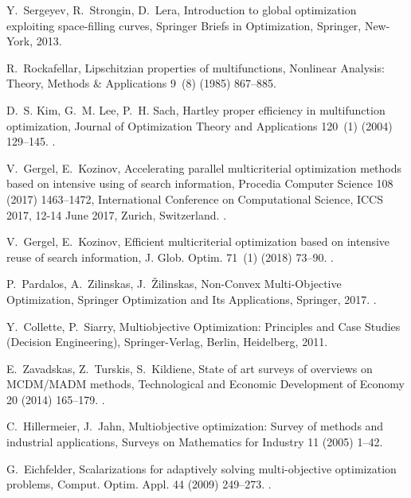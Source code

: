 \documentclass[review]{elsarticle}
\begin{document}
\begin{thebibliography}{10}
Y.~Sergeyev, R.~Strongin, D.~Lera, Introduction to global optimization
  exploiting space-filling curves, Springer Briefs in Optimization, Springer,
  New-York, 2013.

R.~Rockafellar, Lipschitzian properties of multifunctions, Nonlinear Analysis:
  Theory, Methods {\&} Applications 9~(8) (1985) 867--885.

D.~S. Kim, G.~M. Lee, P.~H. Sach, Hartley proper efficiency in multifunction
  optimization, Journal of Optimization Theory and Applications 120~(1) (2004)
  129--145.
\newblock \href {https://doi.org/10.1023/B:JOTA.0000012736.02360.58}
  {}.

V.~Gergel, E.~Kozinov, Accelerating parallel multicriterial optimization
  methods based on intensive using of search information, Procedia Computer
  Science 108 (2017) 1463--1472, {International} Conference on Computational
  Science, {ICCS} 2017, 12-14 June 2017, Zurich, Switzerland.
\newblock \href {https://doi.org/10.1016/j.procs.2017.05.051}
  {}.

V.~Gergel, E.~Kozinov, Efficient multicriterial optimization based on intensive
  reuse of search information, J. Glob. Optim. 71~(1) (2018) 73--90.
\newblock \href {https://doi.org/10.1007/s10898-018-0624-3}
  {}.

P.~Pardalos, A.~Zilinskas, J.~{\v{Z}}ilinskas, Non-Convex Multi-Objective
  Optimization, Springer Optimization and Its Applications, Springer, 2017.
\newblock \href {https://doi.org/10.1007/978-3-319-61007-8}
  {}.

Y.~Collette, P.~Siarry, Multiobjective Optimization: Principles and Case
  Studies (Decision Engineering), Springer-Verlag, Berlin, Heidelberg, 2011.

E.~Zavadskas, Z.~Turskis, S.~Kildiene, State of art surveys of overviews on
  {MCDM}/{MADM} methods, Technological and Economic Development of Economy 20
  (2014) 165--179.
\newblock \href {https://doi.org/10.3846/20294913.2014.892037}
  {}.

C.~Hillermeier, J.~Jahn, Multiobjective optimization: Survey of methods and
  industrial applications, Surveys on Mathematics for Industry 11 (2005) 1--42.

G.~Eichfelder, Scalarizations for adaptively solving multi-objective
  optimization problems, Comput. Optim. Appl. 44 (2009) 249--273.
\newblock \href {https://doi.org/10.1007/s10589-007-9155-4}
  {}.


\end{thebibliography}
\end{document}
